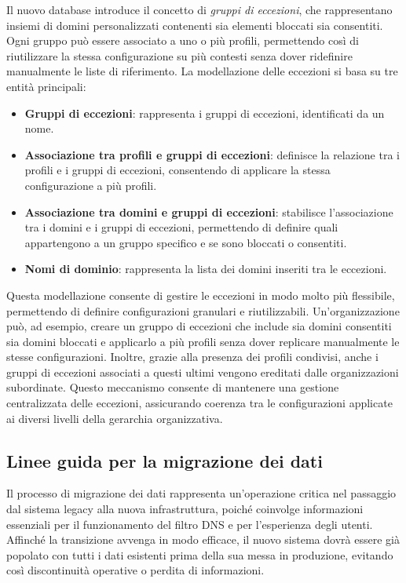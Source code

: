 Il nuovo database introduce il concetto di \emph{gruppi di eccezioni}, che rappresentano insiemi di domini personalizzati contenenti sia elementi bloccati sia consentiti. Ogni gruppo può essere associato a uno o più profili, permettendo così di riutilizzare la stessa configurazione su più contesti senza dover ridefinire manualmente le liste di riferimento. La modellazione delle eccezioni si basa su tre entità principali:
\begin{itemize}
  \item \textbf{Gruppi di eccezioni}: rappresenta i gruppi di eccezioni, identificati da un nome.
  \item \textbf{Associazione tra profili e gruppi di eccezioni}: definisce la relazione tra i profili e i gruppi di eccezioni, consentendo di applicare la stessa configurazione a più profili.
  \item \textbf{Associazione tra domini e gruppi di eccezioni}: stabilisce l'associazione tra i domini e i gruppi di eccezioni, permettendo di definire quali appartengono a un gruppo specifico e se sono bloccati o consentiti.
  \item \textbf{Nomi di dominio}: rappresenta la lista dei domini inseriti tra le eccezioni.
\end{itemize}

Questa modellazione consente di gestire le eccezioni in modo molto più flessibile, permettendo di definire configurazioni granulari e riutilizzabili. Un’organizzazione può, ad esempio, creare un gruppo di eccezioni che include sia domini consentiti sia domini bloccati e applicarlo a più profili senza dover replicare manualmente le stesse configurazioni. Inoltre, grazie alla presenza dei profili condivisi, anche i gruppi di eccezioni associati a questi ultimi vengono ereditati dalle organizzazioni subordinate. Questo meccanismo consente di mantenere una gestione centralizzata delle eccezioni, assicurando coerenza tra le configurazioni applicate ai diversi livelli della gerarchia organizzativa.

\subsection{Linee guida per la migrazione dei dati}
Il processo di migrazione dei dati rappresenta un'operazione critica nel passaggio dal sistema legacy alla nuova infrastruttura, poiché coinvolge informazioni essenziali per il funzionamento del filtro DNS e per l'esperienza degli utenti. Affinché la transizione avvenga in modo efficace, il nuovo sistema dovrà essere già popolato con tutti i dati esistenti prima della sua messa in produzione, evitando così discontinuità operative o perdita di informazioni.

